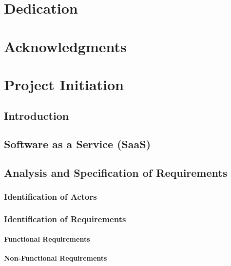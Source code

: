 \documentclass[a4paper,12pt]{report}
\begin{document}
\dominitoc
\newpage
\thispagestyle{empty}
\mbox{}
\newpage

\chapter*{Dedication}
\newpage

\chapter*{Acknowledgments}
\newpage

\tableofcontents
\newpage

\listoffigures
\newpage

\listoftables
\newpage


\chapter{Project Initiation}

\minitoc

\section{Introduction}
\section{Software as a Service (SaaS)}
\section{Analysis and Specification of Requirements}
\subsection{Identification of Actors}
\subsection{Identification of Requirements}
\subsubsection{Functional Requirements}
\subsubsection{Non-Functional Requirements}
\end{document}
